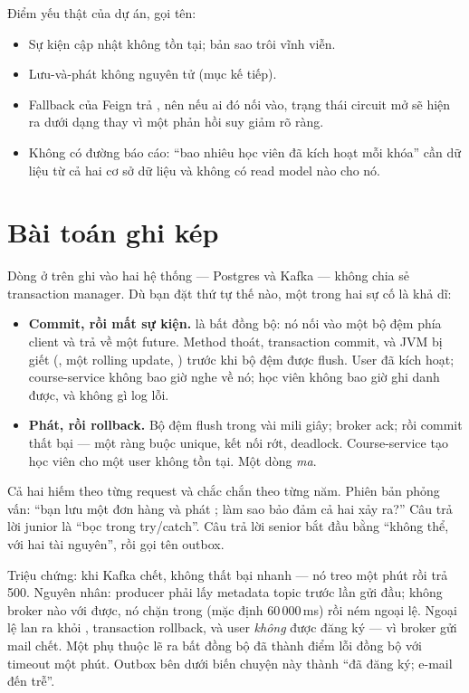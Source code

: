 Điểm yếu thật của dự án, gọi tên:

\begin{itemize}
  \item Sự kiện cập nhật không tồn tại; bản sao trôi vĩnh viễn.
  \item Lưu-và-phát không nguyên tử (mục kế tiếp).
  \item Fallback của Feign trả , nên nếu ai đó nối
   vào, trạng thái circuit mở sẽ hiện ra dưới
  dạng  thay vì một phản hồi suy giảm rõ
  ràng.
  \item Không có đường báo cáo: ``bao nhiêu học viên đã kích hoạt mỗi
  khóa'' cần dữ liệu từ cả hai cơ sở dữ liệu và không có read model nào
  cho nó.
\end{itemize}

\section{Bài toán ghi kép}
\label{sec:dual-write}

Dòng  ở trên ghi vào hai hệ thống --- Postgres và Kafka --- không
chia sẻ transaction manager. Dù bạn đặt thứ tự thế nào, một trong hai
sự cố là khả dĩ:

\begin{itemize}
  \item \textbf{Commit, rồi mất sự kiện.}  là bất đồng
  bộ: nó nối vào một bộ đệm phía client và trả về một future. Method
  thoát, transaction commit, và JVM bị giết (, một
  rolling update, ) trước khi bộ đệm được
  flush. User đã kích hoạt; course-service không bao giờ nghe về nó;
  học viên không bao giờ ghi danh được, và không gì log lỗi.
  \item \textbf{Phát, rồi rollback.} Bộ đệm flush trong vài mili giây;
  broker ack; rồi commit thất bại --- một ràng buộc unique, kết nối
  rớt, deadlock. Course-service tạo học viên cho một user không tồn
  tại. Một dòng \emph{ma}.
\end{itemize}

Cả hai hiếm theo từng request và chắc chắn theo từng năm. Phiên bản
phỏng vấn: ``bạn lưu một đơn hàng và phát ; làm sao
bảo đảm cả hai xảy ra?'' Câu trả lời junior là ``bọc trong try/catch''.
Câu trả lời senior bắt đầu bằng ``không thể, với hai tài nguyên'', rồi
gọi tên outbox.

\begin{pitfall}
Triệu chứng: khi Kafka chết,  không thất
bại nhanh --- nó treo một phút rồi trả 500. Nguyên nhân: producer phải
lấy metadata topic trước lần gửi đầu; không broker nào với được, nó
chặn trong  (mặc định 60\,000\,ms) rồi ném ngoại lệ.
Ngoại lệ lan ra khỏi , transaction rollback, và user
\emph{không} được đăng ký --- vì broker gửi mail chết. Một phụ thuộc lẽ
ra bất đồng bộ đã thành điểm lỗi đồng bộ với timeout một phút. Outbox
bên dưới biến chuyện này thành ``đã đăng ký; e-mail đến trễ''.
\end{pitfall}


